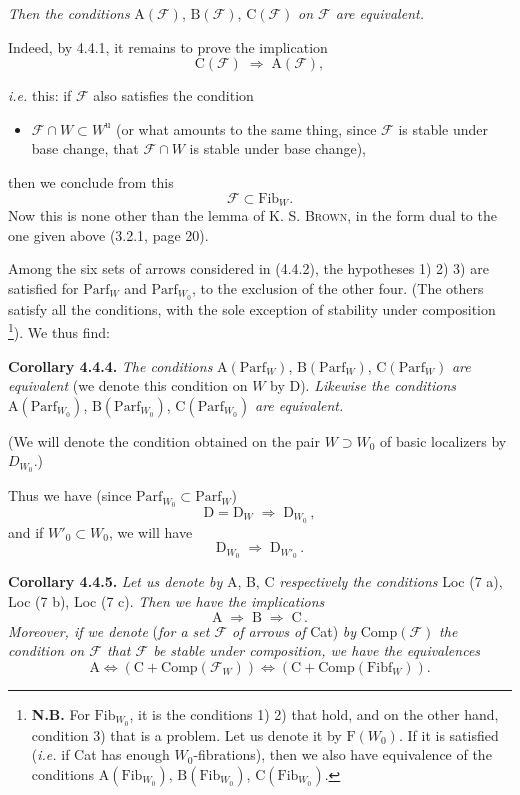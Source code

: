 \documentclass[11pt]{article}
\newcommand{\printedpage}[1]{\marginpar{\footnotesize p.~#1}}
\newcommand{\msp}[1]{\marginpar{\footnotesize [#1]}}
\newcommand{\cF}{\mathcal{F}}
\newcommand{\Fib}{\mathrm{Fib}}
\newcommand{\Fibf}{\mathrm{Fibf}}
\newcommand{\Parf}{\mathrm{Parf}}
\newcommand{\Comp}{\mathrm{Comp}}
\begin{document}
\printedpage{26}
\noindent\textit{Then the conditions} $\mathrm{A}(\cF)$, $\mathrm{B}(\cF)$, $\mathrm{C}(\cF)$ \textit{on $\cF$ are equivalent.}

Indeed, by 4.4.1, it remains to prove the implication
\[
\mathrm{C}(\cF) \;\Longrightarrow\; \mathrm{A}(\cF),
\]

\msp{page 44}

\textit{i.e.} this: if $\cF$ also satisfies the condition
\begin{itemize}[leftmargin=3em]
\item[4)] $\cF \cap W \subset W^{\mathrm{u}}$ (or what amounts to the same thing, since $\cF$ is stable under base change, that $\cF \cap W$ is stable under base change),
\end{itemize}
then we conclude from this
\[
\cF \subset \Fib_W.
\]
Now this is none other than the lemma of K. S. \textsc{Brown}, in the form dual to the one given above (3.2.1, page 20).

Among the six sets of arrows considered in (4.4.2), the hypotheses 1) 2) 3) are satisfied for $\Parf_W$ and $\Parf_{W_0}$, to the exclusion of the other four. (The others satisfy all the conditions, with the sole exception of stability under composition \footnote[30]{\textbf{N.B.} For $\Fib_{W_0}$, it is the conditions 1) 2) that hold, and on the other hand, condition 3) that is a problem. Let us denote it by $\mathrm{F}(W_0)$. If it is satisfied (\textit{i.e.} if Cat has enough $W_0$-fibrations), then we also have equivalence of the conditions $\mathrm{A}(\Fib_{W_0})$, $\mathrm{B}(\Fib_{W_0})$, $\mathrm{C}(\Fib_{W_0})$.}). We thus find:

\textbf{Corollary 4.4.4.} \textit{The conditions} $\mathrm{A}(\Parf_W)$, $\mathrm{B}(\Parf_W)$, $\mathrm{C}(\Parf_W)$ \textit{are equivalent} (we denote this condition on $W$ by D). \textit{Likewise the conditions} $\mathrm{A}(\Parf_{W_0})$, $\mathrm{B}(\Parf_{W_0})$, $\mathrm{C}(\Parf_{W_0})$ \textit{are equivalent.}

\msp{page 45}

(We will denote the condition obtained on the pair $W \supset W_0$ of basic localizers by $D_{W_0}$.)

Thus we have (since $\Parf_{W_0} \subset \Parf_W$)
\[
\mathrm{D} = \mathrm{D}_W \;\Longrightarrow\; \mathrm{D}_{W_0}\,,
\tag*{(4.4.4)}
\]
and if $W'_0 \subset W_0$, we will have
\[
\mathrm{D}_{W_0} \;\Longrightarrow\; \mathrm{D}_{W'_0}\,.
\tag*{(4.4.5)}
\]

\textbf{Corollary 4.4.5.} \textit{Let us denote by} A, B, C \textit{respectively the conditions} Loc (7 a), Loc (7 b), Loc (7 c). \textit{Then we have the implications}
\[
\mathrm{A} \;\Longrightarrow\; \mathrm{B} \;\Longrightarrow\; \mathrm{C}\,.
\tag*{(4.4.5.1)}
\]
\textit{Moreover, if we denote} (\textit{for a set $\cF$ of arrows of} Cat) \textit{by} $\Comp(\cF)$ \textit{the condition on $\cF$ that $\cF$ be stable under composition, we have the equivalences}
\[
\mathrm{A} \iff (\mathrm{C} + \Comp(\cF_W)) \iff (\mathrm{C} + \Comp(\Fibf_W)).
\tag*{(4.4.5.2)}
\]
\end{document}
